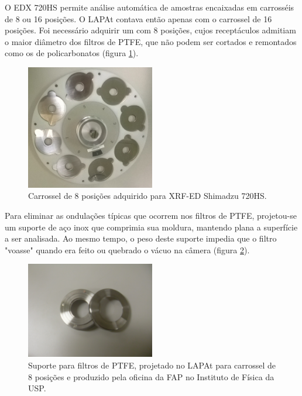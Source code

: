 O EDX 720HS permite análise automática de amostras encaixadas em carrosséis 
de 8 ou 16 posições. O LAPAt contava então apenas com o carrossel de 16 
posições. Foi necessário adquirir um com 8 posições, cujos receptáculos admitiam
o maior diâmetro dos filtros de PTFE, que não podem ser cortados e remontados 
como os de policarbonatos (figura \ref{fig:carrossel8}).

\begin{figure}[H]
  \centering
  \includegraphics[width=0.5\textwidth]{../inputs/images/carrossel8.jpg}
  \caption{Carrossel de 8 posições adquirido para XRF-ED Shimadzu 720HS. 
           \label{fig:carrossel8}}
\end{figure}

Para eliminar as ondulações típicas que ocorrem nos filtros de PTFE, 
projetou-se um suporte de aço inox que comprimia sua moldura, mantendo plana 
a superfície a ser analisada. Ao mesmo tempo, o peso deste suporte impedia que 
o filtro "voasse" quando era feito ou quebrado o vácuo na câmera 
(figura \ref{fig:suporte8}).

\begin{figure}[H]
  \centering
  \includegraphics[width=0.5\textwidth]{../inputs/images/suporte8.jpg}
  \caption{Suporte para filtros de PTFE, projetado no LAPAt para carrossel de 
           8 posições e produzido pela oficina da FAP no 
           Instituto de Física da USP. \label{fig:suporte8}}
\end{figure}

